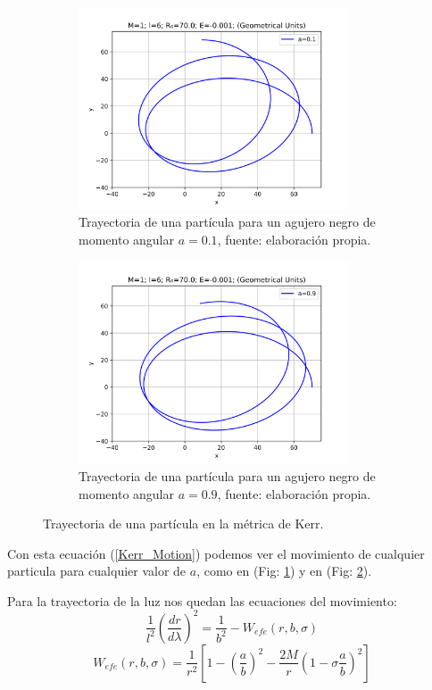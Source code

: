 \documentclass{article}
\begin{document}
\begin{figure}[H]
\begin{subfigure}{0.5\textwidth}
\includegraphics[width=0.9\linewidth, height=6cm]{KerrOrbit01.png} 
\caption{Trayectoria de una partícula para un agujero negro de momento angular $a=0.1$, fuente: elaboración propia.}
\label{fig:Kerr_orbit1}
\end{subfigure}\hspace{1cm}
\begin{subfigure}{0.5\textwidth}
\includegraphics[width=0.9\linewidth, height=6cm]{KerrOrbit09.png}
\caption{Trayectoria de una partícula para un agujero negro de momento angular $a=0.9$, fuente: elaboración propia.}
\label{fig:Kerr_orbit2}
\end{subfigure}
\caption{Trayectoria de una partícula en la métrica de Kerr.}
\label{fig:Kerr_orbit}
\end{figure}

Con esta ecuación (\ref{Kerr_Motion}) podemos ver el movimiento de cualquier particula para cualquier valor de $a$, como en (Fig: \ref{fig:Kerr_orbit1}) y en (Fig: \ref{fig:Kerr_orbit2}).

Para la trayectoria de la luz nos quedan las ecuaciones del movimiento:\cite{zamorageodesicas}
\begin{equation}
    \frac{1}{l^{2}}\left(\frac{dr}{d\lambda}\right)^{2}=\frac{1}{b^{2}}-W_{efe}(r,b,\sigma)
\end{equation}
\begin{equation}
    W_{efe}(r,b,\sigma)=\frac{1}{r^{2}}\left[1-\left(\frac{a}{b}\right)^{2}-\frac{2M}{r}\left(1-\sigma\frac{a}{b}\right)^{2}\right]
\end{equation}
\end{document}
